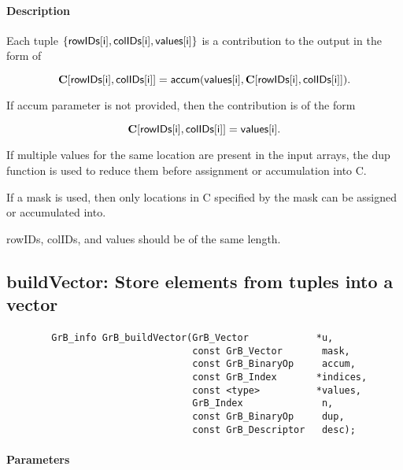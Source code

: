 \paragraph{Description}
Each tuple $\{ {\sf rowIDs[i]}, {\sf colIDs[i]}, {\sf values[i]}\}$ is a contribution to the output in the form of 

$${\bf C}[{\sf rowIDs[i]},{\sf colIDs[i]}] = {\sf accum}({\sf values[i]}, {\bf C}[{\sf rowIDs[i]}, {\sf colIDs[i]}]).$$

If {\sf accum} parameter is not provided, then the contribution is of the form 

$${\bf C}[{\sf rowIDs[i]}, {\sf colIDs[i]}] = {\sf values[i]}.$$

If multiple values for the same location are present in the input arrays, the 
dup function is used to reduce them before assignment or accumulation into {\sf C}.

If a mask is used, then only locations in {\sf C} specified by the mask can be assigned or
accumulated into.
 
{\sf rowIDs}, {\sf colIDs}, and {\sf values} should be of the same length. 

\subsection{{\sf buildVector}: Store elements from tuples into a vector}
\label{Sec:buildVector}

\paragraph{\syntax}

\begin{verbatim}
        GrB_info GrB_buildVector(GrB_Vector            *u,
                                 const GrB_Vector       mask,
                                 const GrB_BinaryOp     accum,
                                 const GrB_Index       *indices,
                                 const <type>          *values,
                                 GrB_Index              n,
                                 const GrB_BinaryOp     dup,
                                 const GrB_Descriptor   desc);
\end{verbatim}

\paragraph{Parameters}

